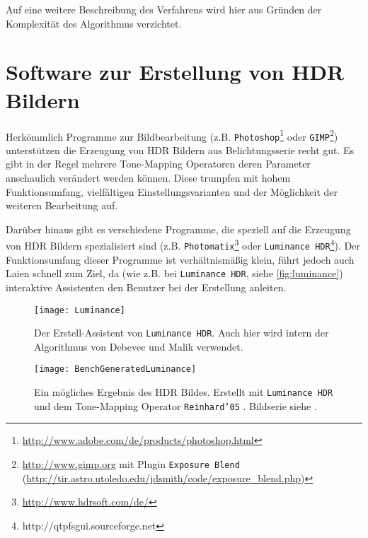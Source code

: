 Auf eine weitere Beschreibung des Verfahrens wird hier aus Gründen der Komplexität des Algorithmus verzichtet.


\section{Software zur Erstellung von HDR Bildern}
\label{sec:software}
Herkömmlich Programme zur Bildbearbeitung (z.B. \texttt{Photoshop}\footnote{\url{http://www.adobe.com/de/products/photoshop.html}} oder \texttt{GIMP}\footnote{\url{http://www.gimp.org} mit Plugin \texttt{Exposure Blend} (\url{http://tir.astro.utoledo.edu/jdsmith/code/exposure_blend.php})}) unterstützen die Erzeugung von \gls{HDR} Bildern aus Belichtungsserie recht gut. Es gibt in der Regel mehrere \gls{Tone-Mapping} Operatoren deren Parameter anschaulich verändert werden können. Diese trumpfen mit hohem Funktionsumfang, vielfältigen Einstellungsvarianten und der Möglichkeit der weiteren Bearbeitung auf.

Darüber hinaus gibt es verschiedene Programme, die speziell auf die Erzeugung von \gls{HDR} Bildern spezialisiert sind (z.B. \texttt{Photomatix}\footnote{\url{http://www.hdrsoft.com/de/}} oder \texttt{Luminance HDR}\footnote{http://qtpfsgui.sourceforge.net}). Der Funktionsumfang dieser Programme ist verhältnismäßig klein, führt jedoch auch Laien schnell zum Ziel, da (wie z.B. bei \texttt{Luminance HDR}, siehe \autoref{fig:luminance}) interaktive Assistenten den Benutzer bei der Erstellung anleiten. 

\begin{figure}
  \begin{center}
    \texttt{[image: Luminance]}
    \caption{Der Erstell-Assistent von \texttt{Luminance HDR}. Auch hier wird intern der Algorithmus von Debevec und Malik \cite{paper} verwendet.}
    \label{fig:luminance}
  \end{center}
\end{figure}

\begin{figure}
  \begin{center}
    \texttt{[image: BenchGeneratedLuminance]}
    \caption{Ein mögliches Ergebnis des HDR Bildes. Erstellt mit \texttt{Luminance HDR} und dem \gls{Tone-Mapping} Operator \texttt{Reinhard'05} \cite{Reinhard05}. Bildserie siehe \cite{tellone}.}
    \label{fig:luminance}
  \end{center}
\end{figure}



